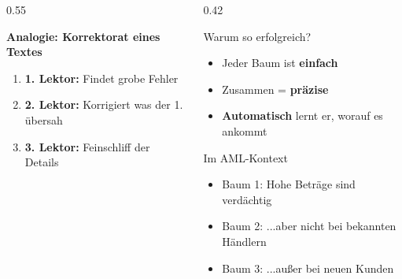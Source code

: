 \documentclass[11pt, aspectratio=169]{beamer}
\begin{document}
\begin{frame}
\begin{columns}[t]
\begin{column}{0.55\textwidth}
\begin{center}
{
            }%
            \end{center}
            \vspace{0.3cm}
            \textbf{Analogie: Korrektorat eines Textes}
            \begin{enumerate}
                \item \textbf{1. Lektor:} Findet grobe Fehler
                \item \textbf{2. Lektor:} Korrigiert was der 1. übersah
                \item \textbf{3. Lektor:} Feinschliff der Details
            \end{enumerate}
        \end{column}
        \begin{column}{0.42\textwidth}
            \begin{block}{Warum so erfolgreich?}
                \begin{itemize}
                    \item Jeder Baum ist \textbf{einfach}
                    \item Zusammen = \textbf{präzise}
                    \item \textbf{Automatisch} lernt er, worauf es ankommt
                \end{itemize}
            \end{block}
            \vspace{0.2cm}
            \begin{exampleblock}{Im AML-Kontext}
                \begin{itemize}
                    \item Baum 1: \glqq Hohe Beträge sind verdächtig\grqq
                    \item Baum 2: \glqq ...aber nicht bei bekannten Händlern\grqq
                    \item Baum 3: \glqq ...außer bei neuen Kunden\grqq
                \end{itemize}
            \end{exampleblock}
        \end{column}
    \end{columns}
\end{frame}
\end{document}
